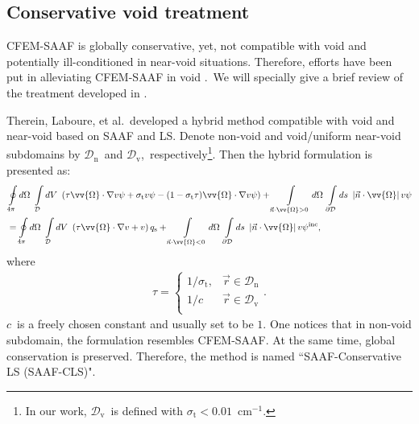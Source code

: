 \documentclass[review]{elsarticle}
\newcommand{\dnn}{\mathcal{D}_\mm{n}}
\newcommand{\dvv}{\mathcal{D}_\mm{v}}
\newcommand{\nno}{\nonumber}
\newcommand{\st}{\sigma_\mathrm{t}}
\newcommand{\psii}[1]{\psi^\mathrm{inc}_\mathrm{{#1}}}
\newcommand{\omen}{\ome\cdot\nabla}
\newcommand{\mm}[1]{\mathrm{#1}}
\newcommand{\pd}{{\partial\mathcal{D}}}
\newcommand{\intli}[1]{\int\limits_{{#1}}}
\newcommand{\ointli}[1]{\oint\limits_{{#1}}}
\newcommand{\ndo}{\vec{n}\cdot\ome}
\newcommand{\absndo}{\left|\ndo\right|}
\newcommand{\qs}{q_\mathrm{s}}
\newcommand{\ome}{\vv{\Omega}}
\newcommand{\dome}{d\Omega}
\begin{document}

\subsection{Conservative void treatment}
{CFEM-SAAF is globally conservative, yet, not compatible with void and potentially ill-conditioned in near-void situations. Therefore, efforts have been put in alleviating CFEM-SAAF in void \cite{clifmc,laboure:2016,yaqi_void,vincent-physor16}.\ We will specially give a brief review of the treatment developed in \cite{laboure:2016,vincent-physor16}.
}

{
Therein, Laboure, et al.\ developed a hybrid method compatible with void and near-void based on SAAF and LS. Denote non-void and void/uniform near-void subdomains by $\dnn$\ and $\dvv$,\ respectively\footnote{{In our work, $\dvv$\ is defined with $\st<0.01$\ cm$^{-1}$.}}. Then the hybrid formulation is presented as:
\begin{align}\label{e:saaf-cls}
&\ointli{4\pi}\dome\ \intli{\mathcal{D}}dV\ \left(\tau\omen v\psi+\st v\psi-(1-\st\tau)\omen v\psi\right)+\intli{\ndo>0}\dome\ \intli{\pd}ds\ \absndo v\psi\nno\\
&=\ointli{4\pi}\dome\ \intli{\mathcal{D}}dV\ \left(\tau\omen v+v\right)\qs+\intli{\ndo<0}\dome\ \intli{\pd}ds\ \absndo v\psii{},
\end{align}
where
\begin{align}
\tau=\begin{cases}
1/\st,&\vec{r}\in\dnn\\
1/c&\vec{r}\in\dvv\\
\end{cases}.
\end{align}
$c$\ is a freely chosen constant and usually set to be $1$. One notices that in non-void subdomain, the formulation resembles CFEM-SAAF. At the same time,  global conservation is preserved. {{Therefore, the method is named ``SAAF-Conservative LS (SAAF-CLS)"}}.
}
\end{document}
